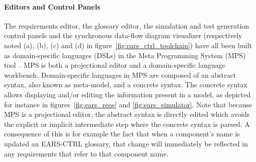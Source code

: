 \paragraph{\textbf{Editors and Control Panels}\\} 
\hspace{-.2cm}
The requirements editor, the glossary editor, the simulation and
test generation control panels and the synchronous data-flow diagram visualizer
(respectively noted (\textsf{a}), (\textsf{b}), (\textsf{c}) and (\textsf{d}) in figure~\ref{fig:ears_ctrl_toolchain}) have all been built as 
domain-specific languages (DSLs) in the Meta Programming System (MPS)
tool~\cite{mps}.
MPS is both a projectional editor and a domain-specific language workbench.
Domain-specific languages in MPS are composed of an abstract syntax, also known
as meta-model, and a concrete syntax. The concrete syntax allows displaying
and/or editing the information present in a model, as depicted for instance in
figures~\ref{fig:ears_reqs} and  \ref{fig:ears_simulator}. Note that because MPS
is a projectional editor, the abstract syntax is directly edited which avoids the explicit or implicit
intermediate step where the concrete syntax is parsed.
A consequence of this is for example the fact that when a component's
name is updated an \textsf{EARS-CTRL} glossary, that change will immediately be
reflected in any requirements that refer to that component name.\vspace{-.1cm} 

